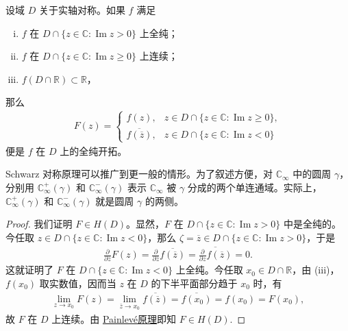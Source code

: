 \documentclass[../../main.tex]{subfiles}%
\begin{document}
\begin{theorem}[Schwarz对称原理]\label{theorem:Schwarz对称原理}
设域 \(D\) 关于实轴对称。如果 \(f\) 满足
\begin{enumerate}[(i)]
\item \(f\) 在 \(D \cap \{z \in \mathbb{C} : \operatorname{Im}z > 0\}\) 上全纯；
\item \(f\) 在 \(D \cap \{z \in \mathbb{C} : \operatorname{Im}z \geqslant 0\}\) 上连续；
\item \(f(D \cap \mathbb{R}) \subset \mathbb{R}\)，
\end{enumerate}
那么
\begin{align*}
F(z) = 
\begin{cases}
f(z), & z \in D \cap \{z \in \mathbb{C} : \operatorname{Im}z \geqslant 0\}, \\
\overline{f(\overline{z})}, & z \in D \cap \{z \in \mathbb{C} : \operatorname{Im}z < 0\}
\end{cases}
\end{align*}
便是 \(f\) 在 \(D\) 上的全纯开拓。
\end{theorem}
\begin{remark}
Schwarz 对称原理可以推广到更一般的情形。为了叙述方便，对 \(\mathbb{C}_{\infty}\) 中的圆周 \(\gamma\)，分别用 \(\mathbb{C}_{\infty}^+(\gamma)\) 和 \(\mathbb{C}_{\infty}^-(\gamma)\) 表示 \(\mathbb{C}_{\infty}\) 被 \(\gamma\) 分成的两个单连通域。实际上，\(\mathbb{C}_{\infty}^+(\gamma)\) 和 \(\mathbb{C}_{\infty}^-(\gamma)\) 就是圆周 \(\gamma\) 的两侧。
\end{remark}
\begin{proof}
我们证明 \(F \in H(D)\)。显然，\(F\) 在 \(D \cap \{z \in \mathbb{C} : \operatorname{Im}z > 0\}\) 中是全纯的。今任取 \(z \in D \cap \{z \in \mathbb{C} : \operatorname{Im}z < 0\}\)，那么 \(\zeta = \overline{z} \in D \cap \{z \in \mathbb{C} : \operatorname{Im}z > 0\}\)，于是
\begin{align*}
\frac{\partial}{\partial \overline{z}} F(z) = \frac{\partial}{\partial \overline{z}} \overline{f(\overline{z})} = \overline{\frac{\partial}{\partial z} f(\overline{z})} = 0.
\end{align*}
这就证明了 \(F\) 在 \(D \cap \{z \in \mathbb{C} : \operatorname{Im}z < 0\}\) 上全纯。今任取 \(x_0 \in D \cap \mathbb{R}\)，由 (iii)，\(f(x_0)\) 取实数值，因而当 \(z\) 在 \(D\) 的下半平面部分趋于 \(x_0\) 时，有
\begin{align*}
\lim\limits_{z \to x_0} F(z) = \lim\limits_{\overline{z} \to x_0} \overline{f(\overline{z})} = \overline{f(x_0)} = f(x_0) = F(x_0),
\end{align*}
故 \(F\) 在 \(D\) 上连续。由 \hyperref[theorem:Painlevé原理]{Painlevé原理}即知 \(F \in H(D)\).
\end{proof}
\end{document}
